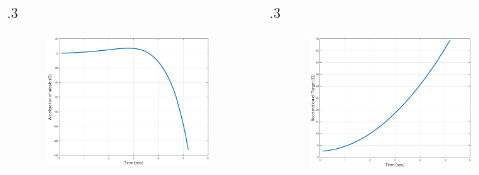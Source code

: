 \documentclass{beamer}
\begin{document}
\begin{frame}
\begin{columns}[c]
	\begin{column} {.3\linewidth}
		\begin{figure}[H]
			\centering
			\includegraphics[scale = 0.18]{fig/MissileAccelerationP3N3.pdf}
		\end{figure}
	\end{column}

	\begin{column} {.3\linewidth}
		\begin{figure}[H]
			\centering
			\includegraphics[scale = 0.18]{fig/TargetAccelerationP3N3.pdf}
		\end{figure}
	\end{column}

\end{columns}

\end{frame}
\end{document}
